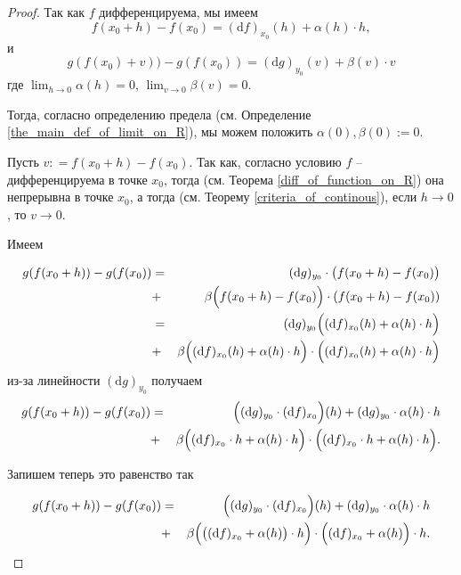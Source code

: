 \begin{proof}

 Так как $f$ дифференцируема, мы имеем
 \[
 f(x_0 + h) - f(x_0) = (\mathrm{d}f)_{x_0}(h) + \alpha(h) \cdot h,
 \] 
 и
 \[
  g(f(x_0) + v)) - g(f(x_0)) = (\mathrm{d}g)_{y_0}(v) + \beta(v)\cdot v
 \]
где $\lim_{h \to 0} \alpha (h) = 0$, $\lim_{v \to 0} \beta (v) = 0$.

Тогда, согласно определению предела (см. Определение \ref{the_main_def_of_limit_on_R}), мы можем положить $\alpha(0), \beta(0) := 0$.

Пусть $v: =f(x_0 + h) - f(x_0)$. Так как, согласно условию $f$ -- дифференцируема в точке $x_0$, тогда (см. Теорема \ref{diff_of_function_on_R}) она непрерывна в точке $x_0$, а тогда (см. Теорему \ref{criteria_of_continous}), если $h\to 0$, то $v \to 0$. 

Имеем

\begin{eqnarray*}
    g(f(x_0 +h)) -g(f(x_0)) &=& (\mathrm{d}g)_{y_0} \cdot \bigl(f(x_0+h) - f(x_0)\bigr)  \\
    &+& \beta\Bigl( f(x_0+h) - f(x_0) \Bigr) \cdot (f(x_0+h) - f(x_0)) \\
    &=& (\mathrm{d}g)_{y_0} \Bigl( (\mathrm{d}f)_{x_0}(h) + \alpha(h) \cdot h\Bigr) \\
    &+& \beta\Bigl(  (\mathrm{d}f)_{x_0}(h) + \alpha(h) \cdot h \Bigr) \cdot \Bigl(  (\mathrm{d}f)_{x_0}(h) + \alpha(h) \cdot h \Bigr)
\end{eqnarray*}
из-за линейности $(\mathrm{d}g)_{y_0}$ получаем
\begin{eqnarray*}
    g(f(x_0 +h )) -g(f(x_0)) &=&\Bigl((\mathrm{d}g)_{y_0 } \cdot (\mathrm{d}f)_{x_0}\Bigr) (h) + (\mathrm{d}g)_{ y_0} \cdot \alpha( h) \cdot h \\
    &+& \beta\Bigl( (\mathrm{d}f)_{x_0}\cdot h + \alpha(h) \cdot h \Bigr) \cdot \Bigl(  (\mathrm{d}f)_{x_0}\cdot h + \alpha(h) \cdot h \Bigr).     
\end{eqnarray*}

Запишем теперь это равенство так

\begin{eqnarray*}
    g(f(x_0 +h )) -g(f(x_0)) &=&\Bigl((\mathrm{d}g)_{y_0 } \cdot (\mathrm{d}f)_{x_0}\Bigr) (h) + (\mathrm{d}g)_{ y_0} \cdot \alpha( h) \cdot h \\
    &+& \beta\Bigl( \bigl( (\mathrm{d}f)_{x_0}+ \alpha(h) \bigr) \cdot h \Bigr) \cdot \Bigl(  (\mathrm{d}f)_{x_0} + \alpha(h) \Bigr)\cdot h.     
\end{eqnarray*}


\end{proof}
